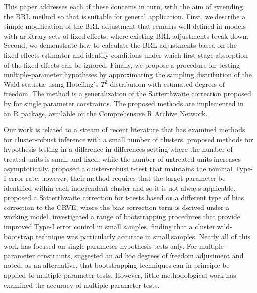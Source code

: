 \documentclass[12pt]{article}\usepackage[]{graphicx}\usepackage[]{color}
\begin{document}
This paper addresses each of these concerns in turn, with the aim of extending the BRL method so that is suitable for general application. 
First, we describe a simple modification of the BRL adjustment that remains well-defined in models with arbitrary sets of fixed effects, where existing BRL adjustments break down. 
Second, we demonstrate how to calculate the BRL adjustments based on the fixed effects estimator and identify conditions under which first-stage absorption of the fixed effects can be ignored.
Finally, we propose a procedure for testing multiple-parameter hypotheses by approximating the sampling distribution of the Wald statistic using Hotelling's $T^2$ distribution with estimated degrees of freedom. 
The method is a generalization of the Satterthwaite correction proposed by \citet{Bell2002bias} for single parameter constraints. 
The proposed methods are implemented in an R package, available on the Comprehensive R Archive Network. 

Our work is related to a stream of recent literature that has examined methods for cluster-robust inference with a small number of clusters. 
\citet{Conley2011inference} proposed methods for hypothesis testing in a difference-in-differences setting where the number of treated units is small and fixed, while the number of untreated units increases asymptotically. 
\citet{Ibragimov2010tstatistic} proposed a cluster-robust t-test that maintains the nominal Type-I error rate; however, their method requires that the target parameter be identified within each independent cluster and so it is not always applicable.
\citet{Young2016improved} proposed a Satterthwaite correction for t-tests based on a different type of bias correction to the CRVE, where the bias correction term is derived under a working model.
\citet{Cameron2008bootstrap} investigated a range of bootstrapping procedures that provide improved Type-I error control in small samples, finding that a cluster wild-bootstrap technique was particularly accurate in small samples. 
Nearly all of this work has focused on single-parameter hypothesis tests only. 
For multiple-parameter constraints, \citet{Cameron2015practitioners} suggested an ad hoc degrees of freedom adjustment and noted, as an alternative, that bootstrapping techniques can in principle be applied to multiple-parameter tests. 
However, little methodological work has examined the accuracy of multiple-parameter tests.
\end{document}
